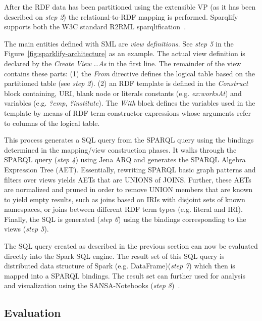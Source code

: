 After the RDF data has been partitioned using the extensible VP (as it has been described on \textit{step 2}) the relational-to-RDF mapping is performed. 
Sparqlify supports both the W3C standard R2RML
sparqlification~\cite{sml}.

The main entities defined with SML are \textit{view definitions}.
See \textit{step 5} in the Figure~\ref{fig:sparklify-architecture} as an example.
The actual view definition is declared by the \emph{Create View} \ldots \emph{As} in the first line.
The remainder of the view contains these parts: (1) the \emph{From} directive defines the logical table based on the partitioned table (see \textit{step 2}).
(2) an RDF template is defined in the \emph{Construct} block containing, URI, blank node or literals constants (e.g. \emph{ex:worksAt}) and variables (e.g. \emph{?emp}, \emph{?institute}).
The \emph{With} block defines the variables used in the template by means of RDF term constructor expressions whose arguments refer to columns of the logical table.

This process generates a SQL query from the SPARQL query using the bindings determined in the mapping/view construction phases.
It walks through the SPARQL query (\textit{step 4}) using Jena ARQ and generates the SPARQL Algebra Expression Tree (AET). Essentially, rewriting SPARQL basic graph patterns and filters over views yields AETs that are UNIONS of JOINS.
Further, these AETs are normalized and pruned in order to remove UNION members that are known to yield empty results, such as joins based on IRIs with disjoint sets of known namespaces, or joins between different RDF term types (e.g. literal and IRI).
Finally, the SQL is generated (\textit{step 6}) using the bindings corresponding to the views (\textit{step 5}).

The SQL query created as described in the previous section can now be evaluated directly into the Spark SQL engine.
The result set of this SQL query is distributed data structure of Spark (e.g. DataFrame)(\textit{step 7}) which then is mapped into a SPARQL bindings.
The result set can further used for analysis and visualization using the SANSA-Notebooks (\textit{step 8})~\cite{iermilov-2017-sansa-iswc-demo}.


\subsection{Evaluation}
\label{sec:sparklify-evaluation}

